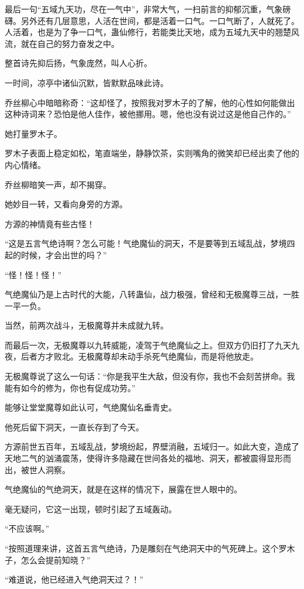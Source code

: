 \begin{this_body}
最后一句“五域九天功，尽在一气中”，非常大气，一扫前言的抑郁沉重，气象磅礴。另外还有几层意思，人活在世间，都是活着一口气。一口气断了，人就死了。人活着，也是为了争一口气，蛊仙修行，若能类比天地，成为五域九天中的翘楚风流，就在自己的努力奋发之中。

整首诗先抑后扬，气象庞然，叫人心折。

一时间，凉亭中诸仙沉默，皆默默品味此诗。

乔丝柳心中暗暗称奇：“这却怪了，按照我对罗木子的了解，他的心性如何能做出这种诗词来？恐怕是他人佳作，被他挪用。嗯，他也没有说过这是他自己作的。”

她打量罗木子。

罗木子表面上稳定如松，笔直端坐，静静饮茶，实则嘴角的微笑却已经出卖了他的内心情绪。

乔丝柳暗笑一声，却不揭穿。

她妙目一转，又看向身旁的方源。

方源的神情竟有些古怪！

“这是五言气绝诗啊？怎么可能！气绝魔仙的洞天，不是要等到五域乱战，梦境四起的时候，才会出世的吗？”

“怪！怪！怪！”

气绝魔仙乃是上古时代的大能，八转蛊仙，战力极强，曾经和无极魔尊三战，一胜一平一负。

当然，前两次战斗，无极魔尊并未成就九转。

而最后一次，无极魔尊以九转威能，凌驾于气绝魔仙之上。但双方仍旧打了九天九夜，后者方才败北。无极魔尊却未动手杀死气绝魔仙，而是将他放走。

无极魔尊说了这么一句话：“你是我平生大敌，但没有你，我也不会刻苦拼命。我能有如今的修为，你也有促成功劳。”

能够让堂堂魔尊如此认可，气绝魔仙名垂青史。

他死后留下洞天，一直长存到了今天。

方源前世五百年，五域乱战，梦境纷起，界壁消融，五域归一。如此大变，造成了天地二气的汹涌震荡，使得许多隐藏在世间各处的福地、洞天，都被震得显形而出，被世人洞察。

气绝魔仙的气绝洞天，就是在这样的情况下，展露在世人眼中的。

毫无疑问，它这一出现，顿时引起了五域轰动。

“不应该啊。”

“按照道理来讲，这首五言气绝诗，乃是雕刻在气绝洞天中的气死碑上。这个罗木子，怎么会提前知晓？”

“难道说，他已经进入气绝洞天过？！”


\end{this_body}
